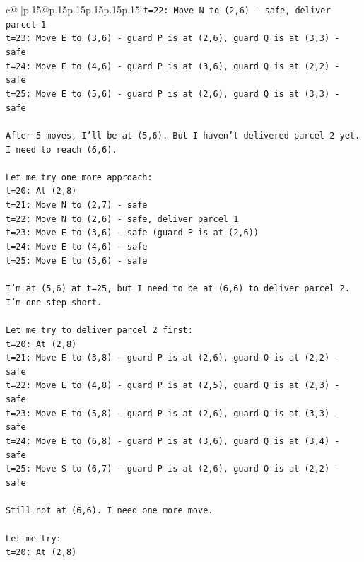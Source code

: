 \documentclass{article}
\begin{document}
{\begin{supertabular}{c@{$\;$}|p{.15\linewidth}@{}p{.15\linewidth}p{.15\linewidth}p{.15\linewidth}p{.15\linewidth}p{.15\linewidth}}
{{{\texttt{t=22: Move N to (2,6) {-} safe, deliver parcel 1} \\
\texttt{t=23: Move E to (3,6) {-} guard P is at (2,6), guard Q is at (3,3) {-} safe} \\
\texttt{t=24: Move E to (4,6) {-} guard P is at (3,6), guard Q is at (2,2) {-} safe} \\
\texttt{t=25: Move E to (5,6) {-} guard P is at (2,6), guard Q is at (3,3) {-} safe} \\
\\ 
\texttt{After 5 moves, I'll be at (5,6). But I haven't delivered parcel 2 yet. I need to reach (6,6).} \\
\\ 
\texttt{Let me try one more approach:} \\
\texttt{t=20: At (2,8)} \\
\texttt{t=21: Move N to (2,7) {-} safe} \\
\texttt{t=22: Move N to (2,6) {-} safe, deliver parcel 1} \\
\texttt{t=23: Move E to (3,6) {-} safe (guard P is at (2,6))} \\
\texttt{t=24: Move E to (4,6) {-} safe} \\
\texttt{t=25: Move E to (5,6) {-} safe} \\
\\ 
\texttt{I'm at (5,6) at t=25, but I need to be at (6,6) to deliver parcel 2. I'm one step short.} \\
\\ 
\texttt{Let me try to deliver parcel 2 first:} \\
\texttt{t=20: At (2,8)} \\
\texttt{t=21: Move E to (3,8) {-} guard P is at (2,6), guard Q is at (2,2) {-} safe} \\
\texttt{t=22: Move E to (4,8) {-} guard P is at (2,5), guard Q is at (2,3) {-} safe} \\
\texttt{t=23: Move E to (5,8) {-} guard P is at (2,6), guard Q is at (3,3) {-} safe} \\
\texttt{t=24: Move E to (6,8) {-} guard P is at (3,6), guard Q is at (3,4) {-} safe} \\
\texttt{t=25: Move S to (6,7) {-} guard P is at (2,6), guard Q is at (2,2) {-} safe} \\
\\ 
\texttt{Still not at (6,6). I need one more move.} \\
\\ 
\texttt{Let me try:} \\
\texttt{t=20: At (2,8)} \\
}}}
\end{supertabular}}
\end{document}
